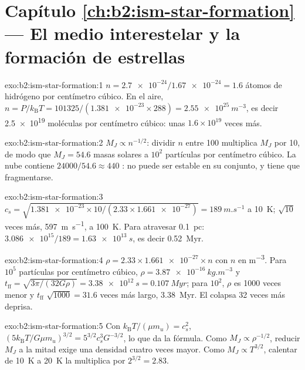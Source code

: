 \section*{Capítulo \ref{ch:b2:ism-star-formation} --- El medio interestelar y la formación de estrellas}

\begin{solution}{exo:b2:ism-star-formation:1}
$n = \num{2.7e-24}/\num{1.67e-24} = 1.6$ átomos de hidrógeno por centímetro cúbico. En el aire,
$n = P/k_{\mathrm B}T = 101325/(\num{1.381e-23}\times288) = \qty{2.55e25}{m^{-3}}$,
es decir \num{2.5e19} moléculas por centímetro cúbico: unas $1.6\times10^{19}$ veces
más.
\end{solution}

\begin{solution}{exo:b2:ism-star-formation:2}
$M_J \propto n^{-1/2}$: dividir $n$ entre 100 multiplica $M_J$ por 10, de modo que
$M_J = 54.6$ masas solares a $10^2$ partículas por centímetro cúbico. La nube contiene
$\num{24000}/54.6 \approx 440$ : no puede ser estable en su conjunto, y tiene que
fragmentarse.
\end{solution}

\begin{solution}{exo:b2:ism-star-formation:3}
$c_s = \sqrt{\num{1.381e-23}\times10/(2.33\times\num{1.661e-27})} =
\qty{189}{m.s^{-1}}$ a \qty{10}{K}; $\sqrt{10}$ veces más, \qty{597}{m.s^{-1}},
a \qty{100}{K}. Para atravesar \qty{0.1}{pc}: $\num{3.086e15}/189 = \qty{1.63e13}{s}$,
es decir \qty{0.52}{Myr}.
\end{solution}

\begin{solution}{exo:b2:ism-star-formation:4}
$\rho = 2.33\times\num{1.661e-27}\times n$ con $n$ en \unit{m^{-3}}. Para $10^5$
partículas por centímetro cúbico, $\rho = \qty{3.87e-16}{kg.m^{-3}}$ y
$t_{\mathrm{ff}} = \sqrt{3\pi/(32G\rho)} = \qty{3.38e12}{s} = \qty{0.107}{Myr}$; para
$10^2$, $\rho$ es \num{1000} veces menor y $t_{\mathrm{ff}}$ $\sqrt{1000} = 31.6$
veces más largo, \qty{3.38}{Myr}. El  colapsa 32 veces más deprisa.
\end{solution}

\begin{solution}{exo:b2:ism-star-formation:5}
Con $k_{\mathrm B}T/(\mu m_u) = c_s^2$, $(5k_{\mathrm B}T/G\mu m_u)^{3/2} =
5^{3/2}c_s^3G^{-3/2}$, lo que da la fórmula. Como $M_J \propto \rho^{-1/2}$,
reducir $M_J$ a la mitad exige una densidad cuatro veces mayor. Como $M_J \propto T^{3/2}$,
calentar de \qty{10}{K} a \qty{20}{K} la multiplica por $2^{3/2} = 2.83$.
\end{solution}

